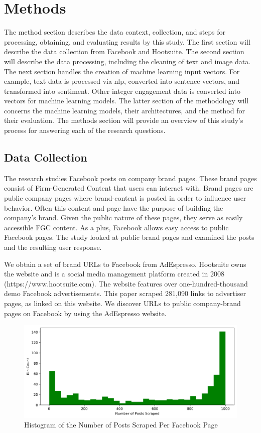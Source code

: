 \documentclass[mksc,blindrev]{informs3} %
\begin{document}
\section{Methods}
The method section describes the data context, collection, and steps for processing, obtaining, and evaluating results by this study. The first section will describe the data collection from Facebook and Hootsuite. The second section will describe the data processing, including the cleaning of text and image data. The next section handles the creation of machine learning input vectors. For example, text data is processed via nlp, converted into sentence vectors, and transformed into sentiment. Other integer engagement data is converted into vectors for machine learning models. The latter section of the methodology will concerns the machine learning models, their architectures, and the method for their evaluation. The methods section will provide an overview of this study's process for answering each of the research questions.

\subsection{Data Collection}
The research studies Facebook posts on company brand pages. These brand pages consist of Firm-Generated Content that users can interact with. Brand pages are public company pages where brand-content is posted in order to influence user behavior. Often this content and page have the purpose of building the company's brand. Given the public nature of these pages, they serve as easily accessible FGC content. As a plus, Facebook allows easy access to public Facebook pages. The study looked at public brand pages and examined the posts and the resulting user response.

We obtain a set of brand URLs to Facebook from AdEspresso. Hootsuite owns the website and is a social media management platform created in 2008 (https://www.hootsuite.com). The website features over one-hundred-thousand demo Facebook advertisements. This paper scraped 281,090 links to advertiser pages, as linked on this website. We discover URLs to public company-brand pages on Facebook by using the AdEspresso website.

\begin{figure}
    \includegraphics[width=\columnwidth]{images/Posts_Per_Page_Histogram.png}
    \caption{Histogram of the Number of Posts Scraped Per Facebook Page}
    \label{fig:histogram_posts_scraped}
\end{figure}
\end{document}
